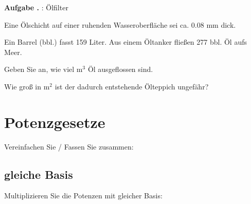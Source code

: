 \TNTeop{}


\textbf{Aufgabe .} : Ölfilter

Eine Ölschicht auf einer ruhenden Wasseroberfläche sei ca. 0.08 mm
dick.

Ein Barrel (bbl.) fasst 159 Liter. Aus einem Öltanker fließen 277 bbl.
Öl aufs Meer.

\begin{bbwAufgabenBlock}
\item Geben Sie an, wie viel m$^3$ Öl ausgeflossen sind.


\item Wie groß in m$^2$ ist der dadurch entstehende Ölteppich ungefähr?

\end{bbwAufgabenBlock}

\TNTeop{}

\newpage
\section{Potenzgesetze}
Vereinfachen Sie / Fassen Sie zusammen:

\noTRAINER{\newpage}






\newpage
\subsection{gleiche Basis}
Multiplizieren Sie die Potenzen mit gleicher Basis:

\noTRAINER{\newpage}



